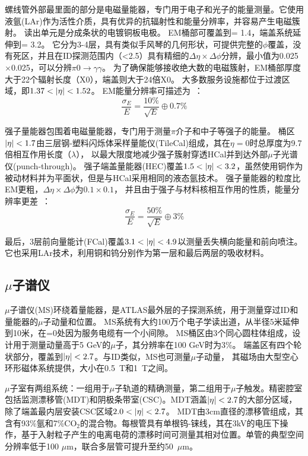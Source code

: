 螺线管外部最里面的部分是电磁量能器，专门用于电子和光子的能量测量。它使用液氩(LAr)作为活性介质，具有优异的抗辐射性和能量分辨率，并容易产生电磁簇射。
读出单元是分成条状的电镀铜板电极。
EM桶部可覆盖到\abseta = 1.4，端盖系统延伸到\abseta = 3.2。
它分为3-4层，具有类似手风琴的几何形状，可提供完整的$\phi$覆盖，没有死区，并且在ID探测范围内（\abseta <2.5）具有精细的$\Delta \eta\times\Delta\phi$分辨，最小值为0.025$\times$0.025，可以分辨$\pi0\rightarrow \gamma\gamma$。
为了确保能够接收绝大数的电磁簇射，EM桶部厚度大于22个辐射长度（X0），端盖则大于24倍X0。
大多数服务设施都位于过渡区域，即$1.37<\abseta<1.52$。
EM能量分辨率可描述为~\cite{ATLAS_Collaboration_2008}：
\begin{equation}
\frac{\sigma_{E}}{E}=\frac{10\%}{\sqrt{E}}\oplus0.7\%
\end{equation}

强子量能器包围着电磁量能器，专门用于测量$\pi$介子和中子等强子的能量。 桶区$|\eta|<1.7$由三层钢-塑料闪烁体采样量能仪(TileCal)组成，其在$\eta = 0$时总厚度为9.7倍相互作用长度（$\lambda$），
以最大限度地减少强子簇射穿透HCal并到达外部$\mu$子光谱仪(punch-through)。
强子端盖量能器(HEC)覆盖$1.5<\abseta<3.2$，虽然使用铜作为被动材料并为平面状，但是与HCal采用相同的液态氩技术。
强子量能器的粒度比EM更粗，$\Delta \eta\times\Delta\phi$为$0.1\times0.1$，
并且由于强子与材料核相互作用的性质，能量分辨率更差~\cite{ATLAS_Collaboration_2008}：
\begin{equation}
\frac{\sigma_{E}}{E}=\frac{50\%}{\sqrt{E}}\oplus3\%
\end{equation}

最后，3层前向量能计(FCal)覆盖$3.1<\abseta<4.9$以测量丢失横向能量和前向喷注。它也采用LAr技术，利用铜和钨分别作为第一层和最后两层的吸收材料。

\subsection{$\mu$子谱仪}
$\mu$子谱仪(MS)环绕着量能器，是ATLAS最外层的子探测系统，用于测量穿过ID和量能器的$\mu$子动量和位置。 MS系统有大约100万个电子学读出道，从半径5米延伸到10米，在\abseta =0处因为服务电缆有一个小间隙。
MS桶区由3个同心圆柱体组成，设计用于测量动量高于5 GeV的$\mu$子，其分辨率在100 GeV时为3\%。 端盖区有四个轮状部分，覆盖到$|\eta|<2.7$。与ID类似，MS也可测量$\mu$子动量，
其磁场由大型空心环形磁体系统提供，大小在0.5~T和1~T之间。

$\mu$子室有两组系统：一组用于$\mu$子轨道的精确测量，第二组用于$\mu$子触发。精密腔室包括监测漂移管(MDT)\cite{Bauer:2016gyg}和阴极条带室(CSC)\cite{Argyropoulos:2009zz}。MDT涵盖$|\eta|<2.7$的大部分区域，
 除了端盖最内层安装CSC区域$2.0<\abseta<2.7$。
 MDT由3cm直径的漂移管组成，其含有93\%氩和7\%CO$_{2}$的混合物。每根管具有单根钨-铼线，其在3kV的电压下操作，基于入射粒子产生的电离电荷的漂移时间可测量其相对位置。单管的典型空间分辨率低于100 $\mu\text{m}$，联合多层管可提升至约50~$\mu\text{m}$。

